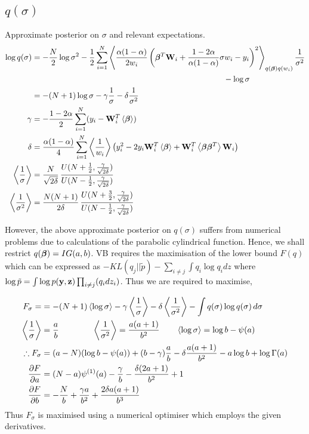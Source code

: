 \begin{appendices}
\subsection{$q(\sigma)$}
\label{sec:q_sigma}
Approximate posterior on $\sigma$ and relevant expectations.
\begin{align}
\nonumber \log q(\sigma) & =-\frac{N}{2}\log \sigma^2-\frac{1}{2}\sum_{i=1}^{N}\left\langle\frac{\alpha(1-\alpha)}{2 w_i}\left(\bm{\beta}^T \mathbf{W}_i+\frac{1-2\alpha}{\alpha(1-\alpha)}\sigma w_i-y_i\right)^2\right\rangle_{q(\bm{\beta})q(w_i)}\frac{1}{\sigma^2}\\
\nonumber &\qquad\qquad\qquad\qquad\qquad\qquad\qquad\qquad\qquad\qquad\qquad\qquad-\log \sigma\\
\nonumber &=-(N+1)\log \sigma-\gamma\frac{1}{\sigma}-\delta\frac{1}{\sigma^2}\\
\gamma &= -{\frac{1-2\alpha}{2}\sum_{i=1}^{N}(y_i-\mathbf{W}_i^T\left\langle\bm{\beta}\right\rangle)}\\
\delta &=\frac{\alpha(1-\alpha)}{4}\sum_{i=1}^{N}\left\langle\frac{1}{w_i}\right\rangle\left(y_i^2-2y_i\mathbf{W}_i^T\left\langle\bm{\beta}\right\rangle+\mathbf{W}_i^T\left\langle\bm{\beta}\bm{\beta}^T\right\rangle\mathbf{W}_i\right)\\
\left\langle\frac{1}{\sigma}\right\rangle&=\frac{N}{\sqrt{2\delta}}\,\frac{U(N+\frac{1}{2},\frac{\gamma}{\sqrt{2\delta}})}{U(N-\frac{1}{2},\frac{\gamma}{\sqrt{2\delta}})}\\
\left\langle\frac{1}{\sigma^2}\right\rangle&=\frac{N(N+1)}{2\delta}\,\frac{U(N+\frac{3}{2},\frac{\gamma}{\sqrt{2\delta}})}{U(N-\frac{1}{2},\frac{\gamma}{\sqrt{2\delta}})}
\end{align}

However, the above approximate posterior on $q(\sigma)$ suffers from numerical problems due to calculations of the parabolic cylindrical function. Hence, we shall restrict $q(\bm{\beta})=IG(a,b)$. VB requires the maximisation of the lower bound $F(q)$ which can be expressed as $-KL(q_j||\tilde{p})-\sum_{i\ne j}\int q_i\log q_i dz$ where $\log\tilde{p}=\int \log p(\mathbf{y},\mathbf{z})\prod_{i\ne j}(q_i dz_i)$. Thus we are required to maximise,

\begin{align}
\nonumber F_\sigma=&=-(N+1)\left\langle\log \sigma\right\rangle-\gamma\left\langle\frac{1}{\sigma}\right\rangle-\delta\left\langle\frac{1}{\sigma^2}\right\rangle-\int q(\sigma)\log q(\sigma)\,d\sigma\\
\nonumber \left\langle\frac{1}{\sigma}\right\rangle&=\frac{a}{b} \qquad\qquad \left\langle\frac{1}{\sigma^2}\right\rangle=\frac{a(a+1)}{b^2} \qquad \left\langle\log \sigma\right\rangle=\log b -\psi(a)\\
\therefore F_\sigma&=(a-N)(\log b-\psi(a))+(b-\gamma)\frac{a}{b}-\delta \frac{a(a+1)}{b^2}-a\log b+\log \Gamma(a)\\
\frac{\partial F}{\partial a}&=(N-a)\psi^{(1)}(a)-\frac{\gamma}{b}-\frac{\delta(2a+1)}{b^2}+1\\
\frac{\partial F}{\partial b}&=-\frac{N}{b}+\frac{\gamma a}{b^2}+\frac{2\delta a(a+1)}{b^3}
\end{align}
Thus $F_\sigma$ is maximised using a numerical optimiser which employs the given derivatives.


\end{appendices}
